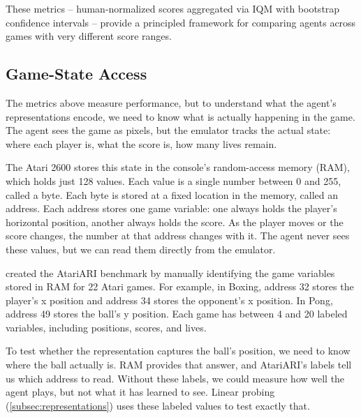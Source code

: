 \smallskip
These metrics -- human-normalized scores aggregated via IQM with
bootstrap confidence intervals -- provide a principled framework
for comparing agents across games with very different score ranges.

\subsection{Game-State Access}
\label{subsec:game-state-access}

The metrics above measure performance, but to understand what the
agent's representations encode, we need to know what is actually
happening in the game. The agent sees the game as pixels, but the
emulator tracks the actual state: where each player is, what the score
is, how many lives remain.

\smallskip
The Atari 2600 stores this state in the console's random-access memory
(RAM), which holds just 128 values. Each value is a single number between 0 and 255, called a byte. Each
byte is stored at a fixed location in the memory, called an address. Each
address stores one game variable: one always holds the player's
horizontal position, another always holds the score. As the player moves
or the score changes, the number at that address changes with it. The agent never
sees these values, but we can read them directly from the emulator.

\smallskip
\citet{anand2019unsupervised} created the AtariARI benchmark by
manually identifying the game variables stored in RAM for 22
Atari games. For example, in Boxing, address 32 stores the player's x
position and address 34 stores the opponent's x position. In Pong,
address 49 stores the ball's y position. Each game has between 4 and 20 labeled variables, including
positions, scores, and lives.

\smallskip
To test whether the representation captures the ball's
position, we need to know where the ball actually is. RAM provides that
answer, and AtariARI's labels tell us which address to read. Without
these labels, we could measure how well the agent plays, but not what it
has learned to see. Linear probing
(\cref{subsec:representations}) uses these labeled values to test
exactly that.
